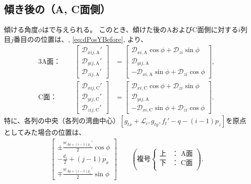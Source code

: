 \subsection{傾き後の\dimple（A, C面側）}
傾ける角度$\phi$はで与えられる。
このとき、傾けた後のAおよびC面側に対する$i$列目$j$番目の\dimple の位置は、, \eqref{eq:dPosYBefore}, より、
\begin{alignat*}{3}
  \text{A面：}&~~&
  \left[
  \begin{array}{c}
    \mathcal D_{xij,\mathrm A}'\\
    \mathcal D_{yij,\mathrm A}'\\
    \mathcal D_{zij,\mathrm A}'
  \end{array}
  \right]
 &= \left[
    \begin{array}{c}
      \mathcal D_{xi,\mathrm A}\cos\phi+\mathcal D_{zi}\sin\phi\\
      \mathcal D_{yij,\mathrm A}\\
      -\mathcal D_{xi,\mathrm A}\sin\phi+\mathcal D_{zi}\cos\phi
    \end{array}
    \right],\\[2pt]
  \text{C面：}&~~&
  \left[
  \begin{array}{c}
    \mathcal D_{xij,\mathrm C}'\\
    \mathcal D_{yij,\mathrm C}'\\
    \mathcal D_{zij,\mathrm C}'
  \end{array}
  \right]
 &= \left[
    \begin{array}{c}
      \mathcal D_{xi,\mathrm C}\cos\phi+\mathcal D_{zi}\sin\phi\\
      \mathcal D_{yij,\mathrm A}\\
      -\mathcal D_{xi,\mathrm C}\sin\phi+\mathcal D_{zi}\cos\phi
    \end{array}
    \right].
\end{alignat*}
特に、各列の中央（各列の湾曲中心）$[g_{tx}+\mathcal L_i, g_{ty}, f_t'-q-(i-1)p_z]$を原点としてみた場合の位置は、
\begin{align*}
  \left[
  \begin{array}{c}
    \displaystyle \pm\frac{w_{Aq+(i-1)p_z}'}2\cos\phi\\[6pt]
    \displaystyle -\frac{d_i}2+(j-1)p_x\\[6pt]
    \displaystyle \mp\frac{w_{Aq+(i-1)p_z}'}2\sin\phi
  \end{array}
  \right]\qquad
  \left(
  \text{複号}
  \left\{
  \begin{array}{rl}
    \!\text{上}\!\!\!& \text{： A面}\\
    \!\text{下}\!\!\!& \text{： C面}\\
  \end{array}
  \right.
  \right).
\end{align*}





